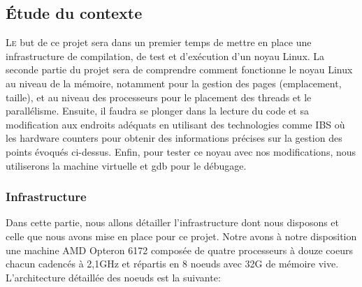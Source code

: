 \subsection{Étude du contexte}

  \lettrine[nindent=0em,lines=3]{L}e but de ce projet sera dans un premier temps
  de mettre en place une infrastructure de compilation, de test et d'exécution
  d'un noyau Linux. La seconde partie du projet sera de comprendre comment
  fonctionne le noyau Linux au niveau de la mémoire, notamment pour la gestion
  des pages (emplacement, taille), et au niveau des processeurs pour le
  placement des threads et le parallélisme. Ensuite, il faudra se plonger dans
  la lecture du code et sa modification aux endroits adéquats en utilisant des
  technologies comme IBS où les hardware counters pour obtenir des informations
  précises sur la gestion des points évoqués ci-dessus. Enfin, pour tester ce
  noyau avec nos modifications, nous utiliserons la machine virtuelle et gdb
  pour le débugage.

  \subsubsection{Infrastructure}
    Dans cette partie, nous allons détailler l'infrastructure dont nous
    disposons et celle que nous avons mise en place pour ce projet. Notre avons
    à notre disposition une machine AMD Opteron 6172 composée de quatre
    processeurs à douze coeurs chacun cadencés à 2,1GHz et répartis en 8 noeuds
    avec 32G de mémoire vive. L'architecture détaillée des noeuds est la
    suivante:



